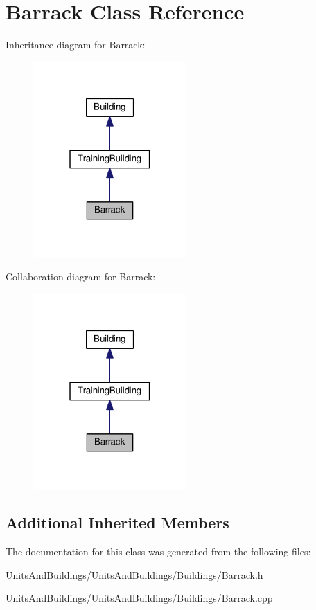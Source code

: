 \hypertarget{class_barrack}{}\section{Barrack Class Reference}
\label{class_barrack}


Inheritance diagram for Barrack\+:
\nopagebreak
\begin{figure}[H]
\begin{center}
\leavevmode
\includegraphics[width=166pt]{class_barrack__inherit__graph}
\end{center}
\end{figure}


Collaboration diagram for Barrack\+:
\nopagebreak
\begin{figure}[H]
\begin{center}
\leavevmode
\includegraphics[width=166pt]{class_barrack__coll__graph}
\end{center}
\end{figure}
\subsection*{Additional Inherited Members}


The documentation for this class was generated from the following files\+:\begin{DoxyCompactItemize}
\item 
Units\+And\+Buildings/\+Units\+And\+Buildings/\+Buildings/Barrack.\+h\item 
Units\+And\+Buildings/\+Units\+And\+Buildings/\+Buildings/Barrack.\+cpp\end{DoxyCompactItemize}
